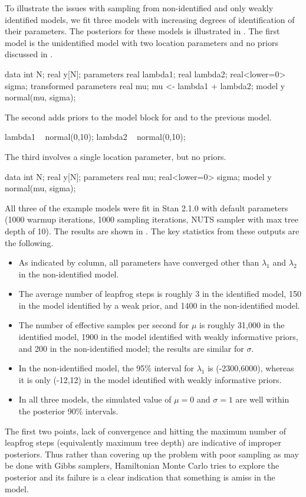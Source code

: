 To illustrate the issues with sampling from non-identified and only
weakly identified models, we fit three models with increasing degrees
of identification of their parameters.  The posteriors for these
models is illustrated in .  The
first model is the unidentified model with two location parameters and
no priors discussed in .
%
\begin{stancode}
data {
  int N;
  real y[N];
}
parameters {
  real lambda1;
  real lambda2;
  real<lower=0> sigma;
}
transformed parameters {
  real mu;
  mu <- lambda1 + lambda2;
}
model {
  y ~ normal(mu, sigma);
}
\end{stancode}
%
The second adds priors to the model block for  and
 to the previous model.
%
\begin{stancode}
  lambda1 ~ normal(0,10);
  lambda2 ~ normal(0,10);
\end{stancode}
%
The third involves a single location parameter, but no priors.
%
\begin{stancode}
data {
  int N;
  real y[N];
}
parameters {
  real mu;
  real<lower=0> sigma;
}
model {
  y ~ normal(mu, sigma);
}
\end{stancode}
%
All three of the example models were fit in Stan 2.1.0 with default
parameters (1000 warmup iterations, 1000 sampling iterations, NUTS
sampler with max tree depth of 10). The results are shown in
. The key statistics from these
outputs are the following.
%
\begin{itemize}
\item As indicated by  column, all parameters have
  converged other than $\lambda_1$ and $\lambda_2$ in the
  non-identified model.
\item
  The average number of leapfrog steps is roughly 3 in
  the identified model, 150 in the model identified by a weak prior, and
  1400 in the non-identified model.
\item 
  The number of effective samples per
  second for $\mu$ is roughly 31,000 in the identified model, 1900 in the model
  identified with weakly informative priors, and 200 in the
  non-identified model; the results are similar for $\sigma$.  
\item 
  In the non-identified model, the 95\% interval for $\lambda_1$ is
  (-2300,6000), whereas it is only (-12,12) in the model identified with
  weakly informative priors.
\item
  In all three models, the simulated value of $\mu=0$ and $\sigma=1$
  are well within the posterior 90\% intervals.
\end{itemize}
%
The first two points, lack of convergence and hitting the maximum
number of leapfrog steps (equivalently maximum tree depth) are
indicative of improper posteriors.  Thus rather than covering up the
problem with poor sampling as may be done with Gibbs samplers,
Hamiltonian Monte Carlo tries to explore the posterior and its failure
is a clear indication that something is amiss in the model.





